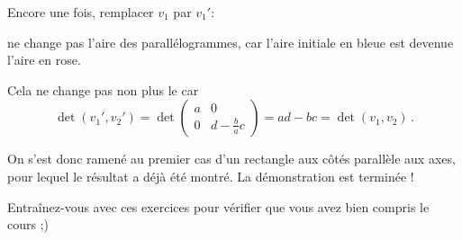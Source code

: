 \change
Encore une fois, remplacer $v_1$ par $v_1'$:

\change
ne change pas l'aire des parallélogrammes, car l'aire initiale en bleue est devenue l'aire en rose.

\change
Cela ne change pas non plus le \deter car 
$$\det(v_1',v_2')=
\det \begin{pmatrix}
a&0\\
0&d-\frac{b}{a}c
\end{pmatrix}
=ad-bc=\det(v_1,v_2)\, .$$

\change
On s'est donc ramené au premier cas d'un rectangle 
aux côtés parallèle aux axes, pour lequel le résultat a déjà été montré.
La démonstration est terminée !

\diapo

Entraînez-vous avec ces exercices pour vérifier que vous avez bien compris le cours ;)


